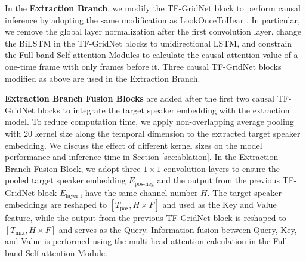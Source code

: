 In the \textbf{Extraction Branch}, we modify the TF-GridNet block to perform causal inference by adopting the same modification as LookOnceToHear \cite{Veluri2024lookonce}. In particular, we remove the global layer normalization after the first convolution layer, change the BiLSTM in the TF-GridNet blocks to unidirectional LSTM, and constrain the Full-band Self-attention Modules to calculate the causal attention value of a one-time frame with only frames before it. Three causal TF-GridNet blocks modified as above are used in the Extraction Branch. 

\textbf{Extraction Branch Fusion Blocks} are added after the first two causal TF-GridNet blocks to integrate the target speaker embedding with the extraction model. To reduce computation time, we apply non-overlapping average pooling with 20 kernel size along the temporal dimension to the extracted target speaker embedding. We discuss the effect of different kernel sizes on the model performance and inference time in Section \ref{sec:ablation}. In the Extraction Branch Fusion Block, we adopt three $1 \times 1$ convolution layers to ensure the pooled target speaker embedding $E_{\text{pos-neg}}$ and the output from the previous TF-GridNet block $E_{\text{layer l}}$ have the same channel number $H$. The target speaker embeddings are reshaped to $[T_{\text{pos}}, H \times F]$ and used as the Key and Value feature, while the output from the previous TF-GridNet block is reshaped to $[T_{\text{mix}}, H \times F]$ and serves as the Query. Information fusion between Query, Key, and Value is performed using the multi-head attention calculation in the Full-band Self-attention Module. 




